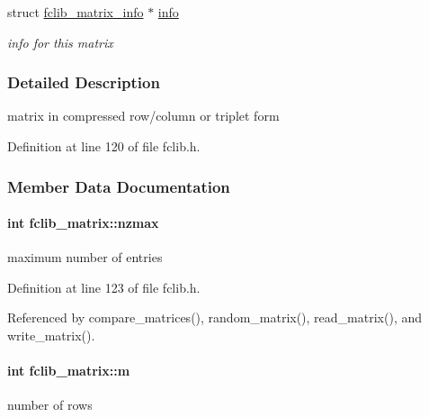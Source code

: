 \begin{DoxyCompactItemize}
struct \hyperlink{structfclib__matrix__info}{fclib\+\_\+matrix\+\_\+info} $\ast$ \hyperlink{structfclib__matrix_ac0af227334c5b0a13a3222c8f04add36}{info}
\begin{DoxyCompactList}\small\item\em info for this matrix \end{DoxyCompactList}\end{DoxyCompactItemize}


\subsubsection{Detailed Description}
matrix in compressed row/column or triplet form 

Definition at line 120 of file fclib.\+h.



\subsubsection{Member Data Documentation}
\hypertarget{structfclib__matrix_ad59323011143dc70ef74f4377279e0d0}{}
\paragraph[{nzmax}]{\setlength{\rightskip}{0pt plus 5cm}int fclib\+\_\+matrix\+::nzmax}\label{structfclib__matrix_ad59323011143dc70ef74f4377279e0d0}


maximum number of entries 



Definition at line 123 of file fclib.\+h.



Referenced by compare\+\_\+matrices(), random\+\_\+matrix(), read\+\_\+matrix(), and write\+\_\+matrix().

\hypertarget{structfclib__matrix_aaec2a835fcc339c3fb84227e2f7b861b}{}
\paragraph[{m}]{\setlength{\rightskip}{0pt plus 5cm}int fclib\+\_\+matrix\+::m}\label{structfclib__matrix_aaec2a835fcc339c3fb84227e2f7b861b}


number of rows 



